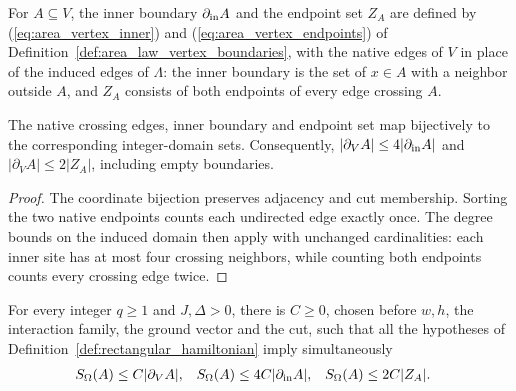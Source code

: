 For $A\subseteq V$, the inner boundary $\partial_{\rm in}A$ and the endpoint
set $Z_A$ are defined by (\ref{eq:area_vertex_inner}) and
(\ref{eq:area_vertex_endpoints}) of
Definition~\ref{def:area_law_vertex_boundaries}, with the native edges of $V$
in place of the induced edges of $\Lambda$: the inner boundary is the set of
$x\in A$ with a neighbor outside $A$, and $Z_A$ consists of both endpoints of
every edge crossing $A$.

\begin{lemma}
    \label{thm:rectangular_boundary_transport}
    \leanok
    The native crossing edges, inner boundary and endpoint set map
    bijectively to the corresponding integer-domain sets. Consequently,
    $|\partial_V A|\le4|\partial_{\rm in}A|$ and
    $|\partial_V A|\le2|Z_A|$, including empty boundaries.
\end{lemma}
\begin{proof}
    \leanok
    The coordinate bijection preserves adjacency and cut membership.
    Sorting the two native endpoints counts each undirected edge exactly
    once. The degree bounds on the induced domain then apply with unchanged
    cardinalities: each inner site has at most four crossing neighbors,
    while counting both endpoints counts every crossing edge twice.
\end{proof}

\begin{definition}
    \label{def:rectangular_entropy_area_law}
    \leanok
    For every integer $q\ge1$ and $J,\Delta>0$, there is $C\ge0$, chosen
    before $w,h$, the interaction family, the ground vector and the cut,
    such that all the hypotheses of Definition~\ref{def:rectangular_hamiltonian}
    imply simultaneously
    \begin{align}
        S_\Omega(A) & \le C|\partial_V A|,
                    & S_\Omega(A)          & \le4C|\partial_{\rm in}A|,
                    & S_\Omega(A)          & \le2C|Z_A|.
        \label{eq:rectangular_entropy_bounds}
    \end{align}
\end{definition}


